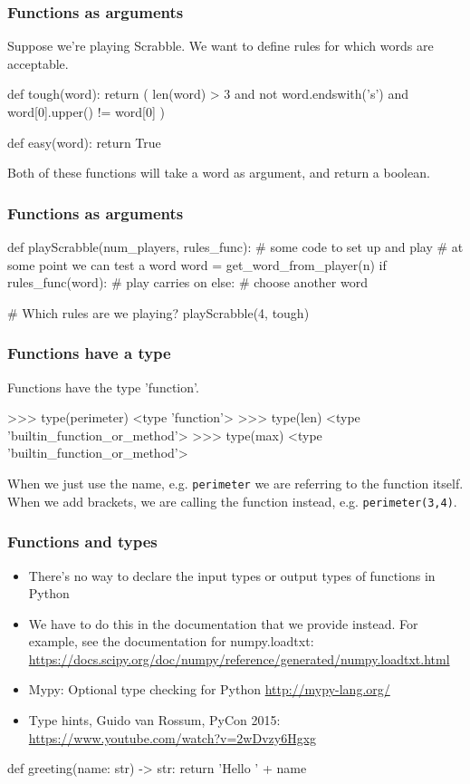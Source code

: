\documentclass{beamer}
\begin{document}
\begin{frame}[fragile]
\frametitle{Functions as arguments}
Suppose we're playing Scrabble. We want to define rules for which
words are acceptable. 
\begin{code}
def tough(word):
   return ( len(word) > 3
            and not word.endswith('s')
            and word[0].upper() != word[0] )

def easy(word):
   return True
\end{code}
Both of these functions will take a word as argument, and return a boolean.
\end{frame}


\begin{frame}[fragile]
\frametitle{Functions as arguments}
\begin{code}
def playScrabble(num_players, rules_func):
   # some code to set up and play
   # at some point we can test a word
   word = get_word_from_player(n)
   if rules_func(word):
      # play carries on
   else:
      # choose another word

# Which rules are we playing?
playScrabble(4, tough)
\end{code}
\end{frame}

\begin{frame}[fragile]
\frametitle{Functions have a type}
Functions have the type 'function'.
\begin{code}
>>> type(perimeter)
<type 'function'>
>>> type(len)
<type 'builtin_function_or_method'>
>>> type(max)
<type 'builtin_function_or_method'>
\end{code}
When we just use the name, e.g. \texttt{perimeter} we are referring
to the function itself. When we add brackets, we are calling the
function instead, e.g.  \texttt{perimeter(3,4)}.
\end{frame}


\begin{frame}[fragile]
\frametitle{Functions and types}
\begin{itemize}
\item There's no way to declare the input types or output types of
  functions in Python 
\item We have to do this in the documentation that we provide
  instead. For example, see the documentation for numpy.loadtxt:
  \url{https://docs.scipy.org/doc/numpy/reference/generated/numpy.loadtxt.html}
\item Mypy: Optional type checking for Python \url{http://mypy-lang.org/}
\item Type hints, Guido van Rossum, PyCon 2015: \url{https://www.youtube.com/watch?v=2wDvzy6Hgxg}
\end{itemize}
\begin{code}
def greeting(name: str) -> str:
    return 'Hello ' + name
\end{code}
\end{frame}
\end{document}
